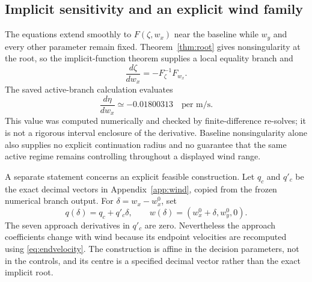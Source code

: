 \subsection{Implicit sensitivity and an explicit wind family}
The equations extend smoothly to $F(\zeta,w_x)$ near the baseline while $w_y$ and every other parameter remain fixed. Theorem~\ref{thm:root} gives nonsingularity at the root, so the implicit-function theorem supplies a local equality branch and
\begin{equation}\label{eq:sensitivity}
 \frac{d\zeta}{dw_x}=-F_{\zeta}^{-1}F_{w_x}.
\end{equation}
The saved active-branch calculation evaluates
\[
 \frac{d\eta}{dw_x}\simeq-0.01800313\quad\text{per m/s}.
\]
This value was computed numerically and checked by finite-difference re-solves; it is not a rigorous interval enclosure of the derivative. Baseline nonsingularity alone also supplies no explicit continuation radius and no guarantee that the same active regime remains controlling throughout a displayed wind range.

A separate statement concerns an explicit feasible construction. Let $q_c$ and $q'_c$ be the exact decimal vectors in Appendix~\ref{app:wind}, copied from the frozen numerical branch output. For $\delta=w_x-w_x^0$, set
\begin{equation}\label{eq:windfamily}
 q(\delta)=q_c+q'_c\delta,\qquad
 w(\delta)=(w_x^0+\delta,w_y^0,0).
\end{equation}
The seven approach derivatives in $q'_c$ are zero. Nevertheless the approach coefficients change with wind because its endpoint velocities are recomputed using \eqref{eq:endvelocity}. The construction is affine in the decision parameters, not in the controls, and its centre is a specified decimal vector rather than the exact implicit root.

